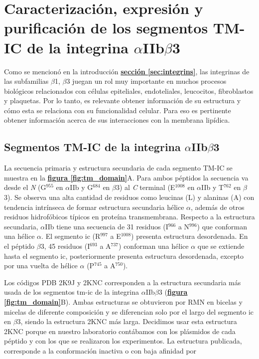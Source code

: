 \chapter{Caracterización, expresión y purificación de los segmentos TM-IC de la integrina $\alpha$IIb$\beta$3}\label{chap:pept}

Como se mencionó en la introducción \hyperref[sec:integrins]{\textbf{sección \ref*{sec:integrins}}}, las integrinas de las subfamilias $\beta$1, $\beta$3 juegan un rol muy importante en muchos procesos biológicos relacionados con células epiteliales, endoteliales, leucocitos, fibroblastos y plaquetas. Por lo tanto, es relevante obtener información de su estructura y cómo esta se relaciona con su funcionalidad celular. Para eso es pertinente obtener información acerca de sus interacciones con la membrana lipídica. 

\section{Segmentos TM-IC de la integrina $\alpha$IIb$\beta$3}

La secuencia primaria y estructura secundaria de cada segmento TM-IC se muestra en la \hyperref[fig:tm_domain]{\textbf{figura \ref*{fig:tm_domain}}}A. Para ambos péptidos la secuencia va desde el \textit{N} (G$^{955}$ en $\alpha$IIb y G$^{684}$ en $\beta$3) al \textit{C} terminal (E$^{1008}$ en $\alpha$IIb y T$^{762}$ en $\beta$3).
Se observa una alta cantidad de residuos como leucinas (L) y alaninas (A) con tendencia intrínseca de formar estructura secundaria hélice $\alpha$, además de otros residuos hidrofóbicos típicos en proteína transmembrana. Respecto a la estructura secundaria, $\alpha$IIb tiene una secuencia de 31 residuos (I$^{966}$ a N$^{996}$) que conforman una hélice $\alpha$. El segmento \ac{ic} (R$^{997}$ a E$^{1008}$) presenta estructura desordenada. En el péptido $\beta$3, 45 residuos (I$^{693}$ a A$^{737}$) conforman una hélice $\alpha$ que se extiende hasta el segmento \ac{ic}, posteriormente presenta estructura desordenada, excepto por una vuelta de hélice $\alpha$ (P$^{745}$ a A$^{750}$).

Los códigos PDB 2K9J \citep{Lau2008} y 2KNC \citep{Yang2009} corresponden a la estructura secundaria más usada de los segmentos \ac{tm}-\ac{ic} de la integrina $\alpha$IIb$\beta$3 (\hyperref[fig:tm_domain]{\textbf{figura \ref*{fig:tm_domain}}}B). Ambas estructuras se obtuvieron por RMN en bicelas y micelas de diferente composición y se diferencian solo por el largo del segmento \ac{ic} en $\beta$3, siendo la estructura 2KNC más larga. Decidimos usar esta estructura 2KNC porque en nuestro laboratorio contábamos con los plásmidos de cada péptido  y con los que se realizaron los experimentos. La estructura publicada, corresponde a la conformación inactiva o con baja afinidad por

